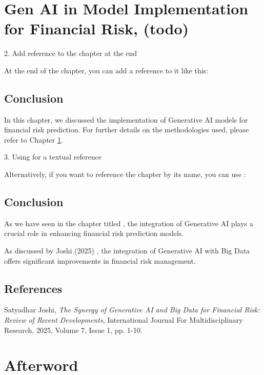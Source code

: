 \documentclass[a4paper,headinclude=on,footinclude=on,12pt,oneside]{scrbook}
\begin{document}
\chapter{Gen AI in Model Implementation for Financial Risk, (todo)} \label{chap:genai}

2. Add reference to the chapter at the end

At the end of the chapter, you can add a reference to it like this:

\section*{Conclusion}
In this chapter, we discussed the implementation of Generative AI models for financial risk prediction. For further details on the methodologies used, please refer to Chapter \ref{chap:genai}.

3. Using \nameref for a textual reference

Alternatively, if you want to reference the chapter by its name, you can use \nameref:

\section*{Conclusion}
As we have seen in the chapter titled , the integration of Generative AI plays a crucial role in enhancing financial risk prediction models.





As discussed by Joshi (2025) \cite{Joshi2025}, the integration of Generative AI with Big Data offers significant improvements in financial risk management.

\section*{References}
\begin{thebibliography}{9}
	Satyadhar Joshi,
	\textit{The Synergy of Generative AI and Big Data for Financial Risk: Review of Recent Developments},
	International Journal For Multidisciplinary Research, 2025, Volume 7, Issue 1, pp. 1-10.
\end{thebibliography}




\chapter*{Afterword}
\end{document}

